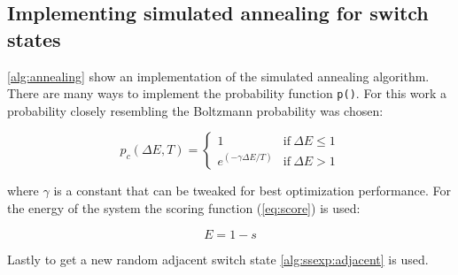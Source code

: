 \subsection{Implementing simulated annealing for switch states}

\autoref{alg:annealing} show an implementation of the simulated annealing algorithm.
There are many ways to implement the probability function \texttt{p()}. For this work
a probability closely resembling the Boltzmann probability was chosen:

\begin{equation}
    p_c(\Delta E, T) = \begin{cases}
        1 & \text{if} \ \Delta E \leq 1\\
        e^{(-\gamma \Delta E/ T)} & \text{if} \ \Delta E > 1
    \end{cases} 
\end{equation}

where $\gamma$ is a constant that can be tweaked for best optimization performance.
For the energy of the system the scoring function (\autoref{eq:score}) is used:

\begin{equation}
    E = 1 - s
\end{equation}

Lastly to get a new random adjacent switch state \autoref{alg:ssexp:adjacent}
is used.